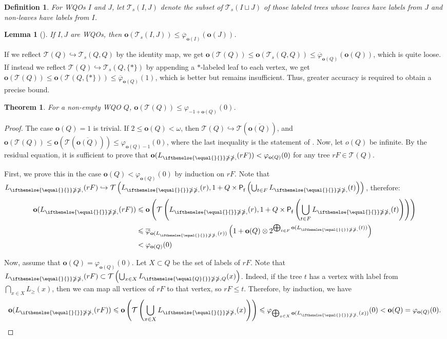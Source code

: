 \documentclass[10pt,a4paper]{amsart}
\let \leq \leqslant
\let \geq \geqslant
\let \ngeq \ngeqslant
\let \phi \varphi
\let \embeds \hookrightarrow
\renewcommand \L [2][]{L_{\ifthenelse{\equal{#1}{}}\ngeq{\ngeq,#1}}(#2)}
\renewcommand \l [2][]{\o(\L[#1]{#2})}
\renewcommand \S [1][]{\mathsf{P_f^{#1}}}
\def \T {\mathcal{T}}
\def \o {\textbf{o}}
\newtheorem{lemma}{Lemma}
\newtheorem{theorem}{Theorem}
\newtheorem{definition}{Definition}
\begin{document}
\begin{definition}
    For WQOs $I$ and $J$, let $\T_s(I, J)$ denote the subset of $\T_s(I \sqcup J)$ of those labeled trees whose leaves have labels from $J$ and non-leaves have labels from $I$.
\end{definition}

\begin{lemma}[{\cite[lemma 6.4]{Friedman2023}}]\label{o(T(I,J))}
    If $I,J$ are WQOs, then $\o(\T_s(I, J)) \leq \overline{\phi}_{\o(I)}(\o(J))$.
\end{lemma}

If we reflect $\T(Q) \embeds \T_s(Q, Q)$ by the identity map, we get $\o(\T(Q)) \leq \o(\T_s(Q, Q)) \leq \overline{\phi}_{\o(Q)}(\o(Q))$, which is quite loose. If instead we reflect $\T(Q) \embeds \T_s(Q, \{*\})$ by appending a $*$-labeled leaf to each vertex, we get $\o(\T(Q)) \leq \o(\T(Q, \{*\})) \leq \overline{\phi}_{\o(Q)}(1)$, which is better but remains insufficient. Thus, greater accuracy is required to obtain a precise bound.


\begin{theorem}
    For a non-empty WQO $Q$, $\o(\T(Q)) \leq \phi_{-1 + \o(Q)}(0)$.
\end{theorem}

\begin{proof}
    The case $\o(Q) = 1$ is trivial. If $2 \leq \o(Q) < \omega$, then $\T(Q) \embeds \T\left(\overline{\o(Q)}\right)$, and $\o(\T(Q)) \leq \o\left(\T\left(\overline{\o(Q)}\right)\right) \leq \phi_{\o(Q)-1}(0)$, where the last inequality is the statement of \cite[proposition 1]{Selivanov2025}. Now, let $o(Q)$ be infinite. By the residual equation, it is sufficient to prove that $\l{rF} < \phi_{\o(Q)}(0)$ for any tree $rF \in \T(Q)$.
    
    First, we prove this in the case $\o(Q) < \phi_{\o(Q)}(0)$ by induction on $rF$. Note that $\L{rF} \embeds \T\left(\L{r}, 1 + Q \times \S\left(\bigcup_{t \in F} \L{t}\right)\right)$, therefore:
    \begin{align*}
        \l{rF}
        &\leq \o\left(\T\left(\L{r}, 1 + Q \times \S\left(\bigcup_{t \in F} \L{t}\right)\right)\right)\\
        &\leq \overline{\phi}_{\l{r}}\left(1 + \o(Q) \otimes 2^{\bigoplus_{t \in F} \l{t}}\right)\\
        &< \phi_{\o(Q)}(0)
    \end{align*}
    
    Now, assume that $\o(Q) = \phi_{\o(Q)}(0)$. Let $X \subset Q$ be the set of labels of $rF$. Note that $\L{rF} \subset \T\left(\bigcup_{x \in X} \L[Q]{x}\right)$. Indeed, if the tree $t$ has a vertex with label from $\bigcap_{x \in X} L_\geq(x)$, then we can map all vertices of $rF$ to that vertex, so $rF \leq t$. Therefore, by induction, we have 
    $$\l{rF} \leq \o\left(\T\left(\bigcup_{x \in X} \L{x}\right)\right) \leq \phi_{\bigoplus_{x \in X} \l{x}}(0) < \o(Q) = \phi_{\o(Q)}(0).$$
\end{proof}
\end{document}
